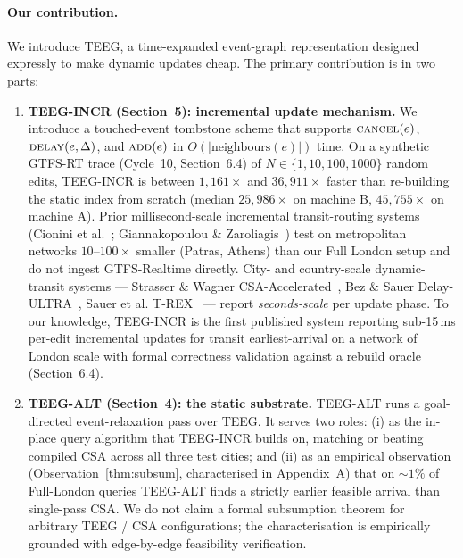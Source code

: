 \documentclass[letterpaper]{article}
\theoremstyle{definition}
\theoremstyle{plain}
\begin{document}
\paragraph{Our contribution.}
We introduce TEEG, a time-expanded event-graph representation
designed expressly to make dynamic updates cheap. The primary
contribution is in two parts:

\begin{enumerate}
\item \textbf{TEEG-INCR (Section~5): incremental update mechanism.}
We introduce a touched-event tombstone scheme that supports
$\textsc{cancel}(e)$, $\textsc{delay}(e, \Delta)$, and $\textsc{add}(e)$
in $O(|\text{neighbours}(e)|)$ time. On a synthetic GTFS-RT trace
(Cycle~10, Section~6.4) of $N \in \{1, 10, 100, 1000\}$ random edits,
TEEG-INCR is between $1{,}161\times$ and $36{,}911\times$ faster than
re-building the static index from scratch (median $25{,}986\times$ on
machine B, $45{,}755\times$ on machine A). Prior millisecond-scale
incremental transit-routing systems (Cionini et al.~\cite{cionini2014dtm};
Giannakopoulou \& Zaroliagis~\cite{giannakopoulou2019mdtm}) test on
metropolitan networks $10\text{--}100\times$ smaller (Patras, Athens)
than our Full London setup and do not ingest GTFS-Realtime directly.
City- and country-scale dynamic-transit systems --- Strasser \&
Wagner CSA-Accelerated~\cite{strasser2014csaaccelerated}, Bez \&
Sauer Delay-ULTRA~\cite{bez2024delayultra}, Sauer et al.
T-REX~\cite{sauer2026trex} --- report \emph{seconds-scale} per
update phase. To our knowledge, TEEG-INCR is the first published
system reporting sub-15\,ms per-edit incremental updates for transit
earliest-arrival on a network of London scale with formal correctness
validation against a rebuild oracle (Section~6.4).

\item \textbf{TEEG-ALT (Section~4): the static substrate.} TEEG-ALT
runs a goal-directed event-relaxation pass over TEEG. It serves two
roles: (i) as the in-place query algorithm that TEEG-INCR builds on,
matching or beating compiled CSA across all three test cities; and
(ii) as an empirical observation (Observation~\ref{thm:subsum},
characterised in Appendix~A) that on $\sim\!1\%$ of Full-London
queries TEEG-ALT finds a strictly earlier feasible arrival than
single-pass CSA. We do not claim a formal subsumption theorem for
arbitrary TEEG / CSA configurations; the characterisation is
empirically grounded with edge-by-edge feasibility verification.
\end{enumerate}
\end{document}
